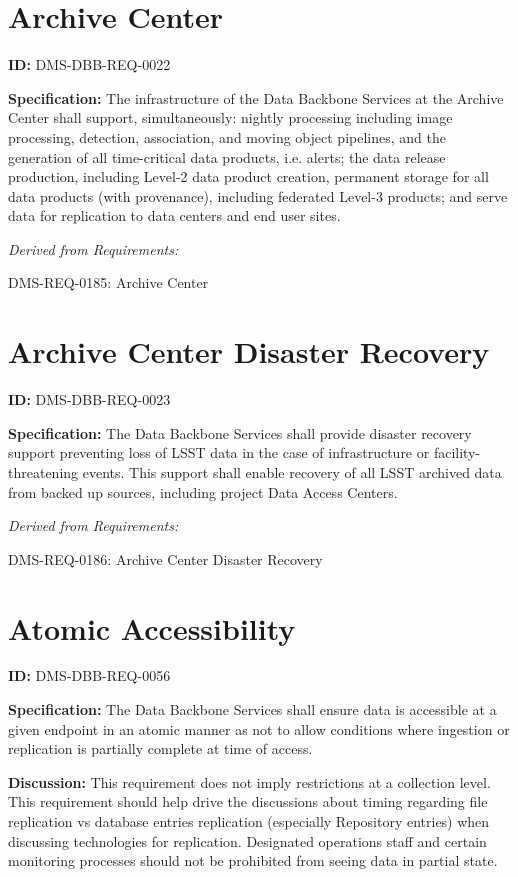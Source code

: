 \documentclass[SE,toc,lsstdraft]{lsstdoc}
\begin{document}
\section{Archive Center}

\label{DMS-DBB-REQ-0022}
\textbf{ID:} DMS-DBB-REQ-0022

\textbf{Specification:}
The infrastructure of the Data Backbone Services at the Archive Center shall support, simultaneously: nightly processing including image processing, detection, association, and moving object pipelines, and the generation of all time-critical data products, i.e. alerts; the data release production, including Level-2 data product creation, permanent storage for all data products (with provenance), including federated Level-3 products; and serve data for replication to data centers and end user sites.

\emph{Derived from Requirements:}

DMS-REQ-0185:
Archive Center \newline

\section{Archive Center Disaster Recovery}

\label{DMS-DBB-REQ-0023}
\textbf{ID:} DMS-DBB-REQ-0023

\textbf{Specification:}
The Data Backbone Services shall provide disaster recovery support preventing loss of LSST data in the case of infrastructure or facility-threatening events. This support shall enable recovery of all LSST archived data from backed up sources, including project Data Access Centers.

\emph{Derived from Requirements:}

DMS-REQ-0186:
Archive Center Disaster Recovery \newline

\section{Atomic Accessibility}

\label{DMS-DBB-REQ-0056}
\textbf{ID:} DMS-DBB-REQ-0056

\textbf{Specification:}
The Data Backbone Services shall ensure data is accessible at a given endpoint in an atomic manner as not to allow conditions where ingestion or replication is partially complete at time of access.

\textbf{Discussion:}
This requirement does not imply restrictions at a collection level.  This requirement should help drive the discussions about timing regarding file replication vs database entries replication (especially Repository entries) when discussing technologies for replication.    Designated operations staff and certain monitoring processes should not be prohibited from seeing data in partial state.
\end{document}
